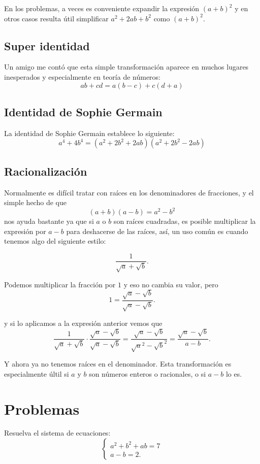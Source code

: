 En los problemas, a veces es conveniente
expandir la expresión $(a + b)^2$
y en otros casos resulta útil simplificar
$a^2 + 2ab + b^2$ como $(a + b)^2$.

\subsection{Super identidad}
Un amigo me contó que esta simple
transformación aparece en muchos lugares
inesperados y especialmente en teoría de números:
\[ab + cd = a(b - c) + c(d + a)\]

\subsection{Identidad de Sophie Germain}
La identidad de Sophie Germain establece lo siguiente:
\[a^4 + 4b^4 = (a^2 + 2b^2 + 2ab)(a^2 + 2b^2 - 2ab)\]

\subsection{Racionalización}
Normalmente es difícil tratar con raíces en
los denominadores de fracciones,
y el simple hecho de que
\[(a + b)(a - b) = a^2 - b^2\]
nos ayuda bastante ya que si
$a$ o $b$ son raíces cuadradas, es posible
multiplicar la expresión por $a - b$
para deshacerse de las raíces,
así, un uso común es cuando tenemos algo del
siguiente estilo:

\[\frac1{\sqrt a + \sqrt b}.\]

Podemos multiplicar la fracción
por $1$ y eso no cambia su valor,
pero
\[1 = \frac{\sqrt a - \sqrt b}{\sqrt a - \sqrt b}.\]

y si lo aplicamos a la expresión anterior vemos que
\[\frac1{\sqrt a + \sqrt b}\cdot\frac{\sqrt a - \sqrt b}{\sqrt a - \sqrt b} = \frac{\sqrt a - \sqrt b}{\sqrt a ^2 - \sqrt b ^2} = \frac{\sqrt a - \sqrt b}{a - b}.\]

Y ahora ya no tenemos raíces en el denominador.
Esta transformación es especialmente
últil si $a$ y $b$ son números
enteros o racionales, o
si $a - b$ lo es.

\section{Problemas}

\begin{problem}
Resuelva el sistema de ecuaciones:
\begin{equation*}
	\begin{cases}
		a^2 + b^2 + ab = 7 \\
		a - b          = 2.
	\end{cases}
\end{equation*}
\end{problem}

